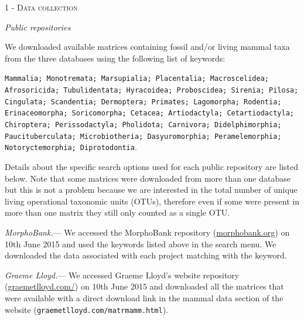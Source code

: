 \documentclass[12pt,letterpaper]{article}
\renewcommand{\section}[1]{%
\bigskip
\begin{center}
\begin{Large}
\normalfont\scshape #1
\medskip
\end{Large}
\end{center}}
\renewcommand{\subsection}[1]{%
\bigskip
\begin{center}
\begin{large}
\normalfont\itshape #1
\end{large}
\end{center}}
\renewcommand{\subsubsection}[1]{%
\vspace{2ex}
\noindent
\textit{#1.}---}
\begin{document}


\section{1 - Data collection}
\subsection{Public repositories}
We downloaded available matrices containing fossil and/or living mammal taxa from the three databases using the following list of keywords:

\texttt{Mammalia; Monotremata; Marsupialia; Placentalia; Macroscelidea; Afrosoricida; Tubulidentata; Hyracoidea; Proboscidea; Sirenia; Pilosa; Cingulata; Scandentia; Dermoptera; Primates; Lagomorpha; Rodentia; Erinaceomorpha; Soricomorpha; Cetacea; Artiodactyla; Cetartiodactyla; Chiroptera; Perissodactyla; Pholidota; Carnivora; Didelphimorphia; Paucituberculata; Microbiotheria; Dasyuromorphia; Peramelemorphia; Notoryctemorphia; Diprotodontia}.

Details about the specific search options used for each public repository are listed below.
Note that some matrices were downloaded from more than one database but this is not a problem because we are interested in the total number of unique living operational taxonomic units (OTUs), therefore even if some were present in more than one matrix they still only counted as a single OTU.

\subsubsection{MorphoBank}
We accessed the MorphoBank repository (\url{morphobank.org}) on 10th June 2015 and used the keywords listed above in the search menu.
We downloaded the data associated with each project matching with the keyword.

\subsubsection{Graeme Lloyd}
We accessed Graeme Lloyd's website repository (\url{graemetlloyd.com/}) on 10th June 2015 and downloaded all the matrices that were available with a direct download link in the mammal data section of the website (\texttt{graemetlloyd.com/matrmamm.html}).
\end{document}
